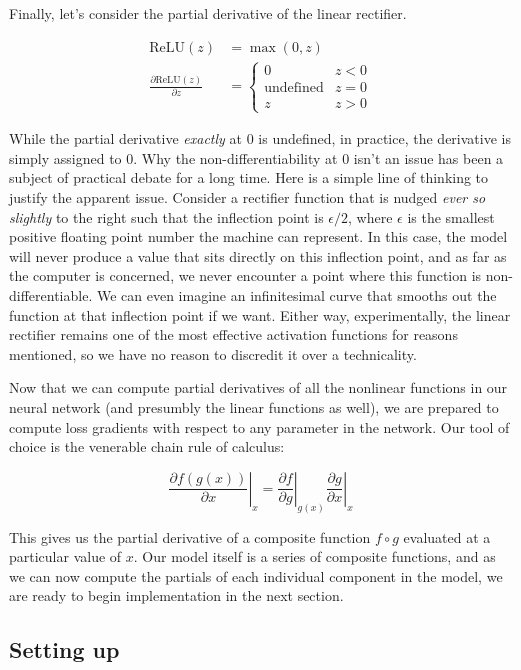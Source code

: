 \documentclass[
]{article}
\begin{document}
Finally, let's consider the partial derivative of the linear rectifier.

\[
\begin{aligned}
\mathrm{ReLU}(z) &= \max(0, z) \\
\frac{\partial \mathrm{ReLU}(z)}{\partial z} &=
\begin{cases}
0 & z < 0 \\
\mathrm{undefined} & z = 0 \\
z & z > 0
\end{cases}
\end{aligned}
\]

While the partial derivative \emph{exactly} at 0 is undefined, in
practice, the derivative is simply assigned to 0. Why the
non-differentiability at 0 isn't an issue has been a subject of
practical debate for a long time. Here is a simple line of thinking to
justify the apparent issue. Consider a rectifier function that is nudged
\emph{ever so slightly} to the right such that the inflection point is
\(\epsilon / 2\), where \(\epsilon\) is the smallest positive floating
point number the machine can represent. In this case, the model will
never produce a value that sits directly on this inflection point, and
as far as the computer is concerned, we never encounter a point where
this function is non-differentiable. We can even imagine an
infinitesimal curve that smooths out the function at that inflection
point if we want. Either way, experimentally, the linear rectifier
remains one of the most effective activation functions for reasons
mentioned, so we have no reason to discredit it over a technicality.

Now that we can compute partial derivatives of all the nonlinear
functions in our neural network (and presumbly the linear functions as
well), we are prepared to compute loss gradients with respect to any
parameter in the network. Our tool of choice is the venerable chain rule
of calculus:

\[\left.\frac{\partial f(g(x))}{\partial x}\right\rvert_x = \left.\frac{\partial f}{\partial g}\right\rvert_{g(x)} \left.\frac{\partial g}{\partial x}\right\rvert_x\]

This gives us the partial derivative of a composite function
\(f\circ g\) evaluated at a particular value of \(x\). Our model itself
is a series of composite functions, and as we can now compute the
partials of each individual component in the model, we are ready to
begin implementation in the next section.

\hypertarget{setting-up}{%
\subsection{Setting up}\label{setting-up}}
\end{document}
